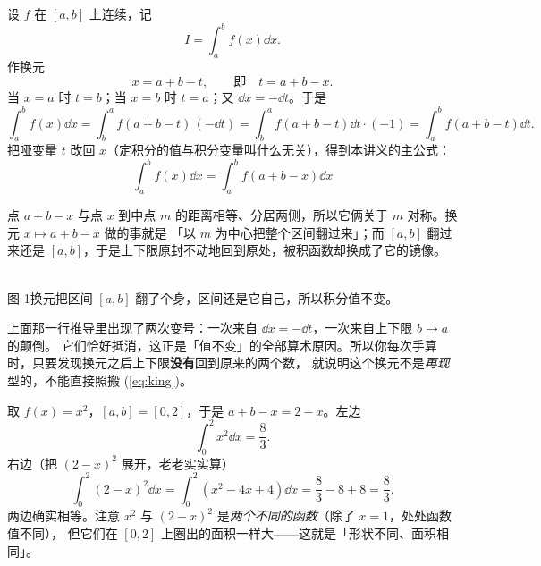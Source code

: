 \documentclass[11pt]{ctexart}
\begin{document}
\flowerrule


设 $f$ 在 $[a,b]$ 上连续，记
\[
I=\int_a^b f(x)\dd x .
\]
作换元
\[
x=a+b-t,\qquad \text{即}\quad t=a+b-x .
\]
当 $x=a$ 时 $t=b$；当 $x=b$ 时 $t=a$；又 $\dd x=-\dd t$。于是
\[
\int_a^b f(x)\dd x=\int_b^a f(a+b-t)\,(-\dd t)
=\int_b^a f(a+b-t)\dd t\cdot(-1)
=\int_a^b f(a+b-t)\dd t .
\]
把哑变量 $t$ 改回 $x$（定积分的值与积分变量叫什么无关），得到本讲义的主公式：
\begin{equation}
\boxed{\;\int_a^b f(x)\dd x=\int_a^b f(a+b-x)\dd x\;}
\label{eq:king}
\end{equation}


点 $a+b-x$ 与点 $x$ 到中点 $m$ 的距离相等、分居两侧，所以它俩关于 $m$ 对称。换元 $x\mapsto a+b-x$ 做的事就是
「以 $m$ 为中心把整个区间翻过来」；而 $[a,b]$ 翻过来还是 $[a,b]$，于是上下限原封不动地回到原处，被积函数却换成了它的镜像。

\begin{center}
\\[-2pt]
{\small\color{inkgray}图 1\quad 换元把区间 $[a,b]$ 翻了个身，区间还是它自己，所以积分值不变。}
\end{center}


上面那一行推导里出现了两次变号：一次来自 $\dd x=-\dd t$，一次来自上下限 $b\to a$ 的颠倒。
它们恰好抵消，这正是「值不变」的全部算术原因。所以你每次手算时，只要发现换元之后上下限\textbf{没有}回到原来的两个数，
就说明这个换元不是\emph{再现}型的，不能直接照搬 (\ref{eq:king})。


取 $f(x)=x^2$，$[a,b]=[0,2]$，于是 $a+b-x=2-x$。左边
\[
\int_0^2 x^2\dd x=\frac{8}{3}.
\]
右边（把 $(2-x)^2$ 展开，老老实实算）
\[
\int_0^2 (2-x)^2\dd x=\int_0^2\left(x^2-4x+4\right)\dd x
=\frac{8}{3}-8+8=\frac{8}{3}.
\]
两边确实相等。注意 $x^2$ 与 $(2-x)^2$ 是\emph{两个不同的函数}（除了 $x=1$，处处函数值不同），
但它们在 $[0,2]$ 上圈出的面积一样大——这就是「形状不同、面积相同」。
\end{document}
